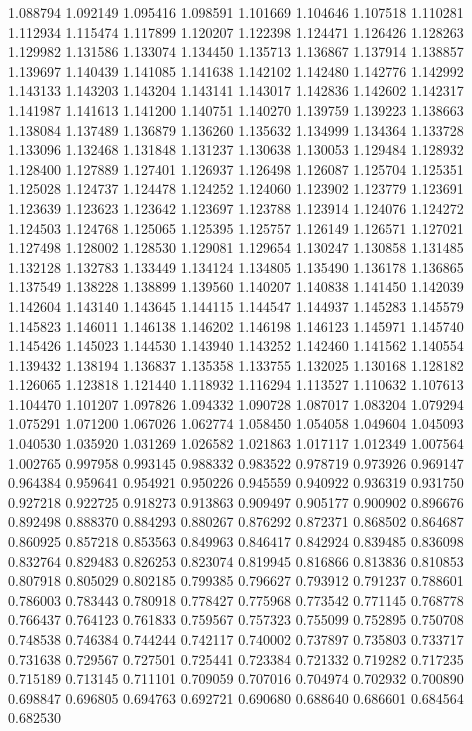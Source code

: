 1.088794
1.092149
1.095416
1.098591
1.101669
1.104646
1.107518
1.110281
1.112934
1.115474
1.117899
1.120207
1.122398
1.124471
1.126426
1.128263
1.129982
1.131586
1.133074
1.134450
1.135713
1.136867
1.137914
1.138857
1.139697
1.140439
1.141085
1.141638
1.142102
1.142480
1.142776
1.142992
1.143133
1.143203
1.143204
1.143141
1.143017
1.142836
1.142602
1.142317
1.141987
1.141613
1.141200
1.140751
1.140270
1.139759
1.139223
1.138663
1.138084
1.137489
1.136879
1.136260
1.135632
1.134999
1.134364
1.133728
1.133096
1.132468
1.131848
1.131237
1.130638
1.130053
1.129484
1.128932
1.128400
1.127889
1.127401
1.126937
1.126498
1.126087
1.125704
1.125351
1.125028
1.124737
1.124478
1.124252
1.124060
1.123902
1.123779
1.123691
1.123639
1.123623
1.123642
1.123697
1.123788
1.123914
1.124076
1.124272
1.124503
1.124768
1.125065
1.125395
1.125757
1.126149
1.126571
1.127021
1.127498
1.128002
1.128530
1.129081
1.129654
1.130247
1.130858
1.131485
1.132128
1.132783
1.133449
1.134124
1.134805
1.135490
1.136178
1.136865
1.137549
1.138228
1.138899
1.139560
1.140207
1.140838
1.141450
1.142039
1.142604
1.143140
1.143645
1.144115
1.144547
1.144937
1.145283
1.145579
1.145823
1.146011
1.146138
1.146202
1.146198
1.146123
1.145971
1.145740
1.145426
1.145023
1.144530
1.143940
1.143252
1.142460
1.141562
1.140554
1.139432
1.138194
1.136837
1.135358
1.133755
1.132025
1.130168
1.128182
1.126065
1.123818
1.121440
1.118932
1.116294
1.113527
1.110632
1.107613
1.104470
1.101207
1.097826
1.094332
1.090728
1.087017
1.083204
1.079294
1.075291
1.071200
1.067026
1.062774
1.058450
1.054058
1.049604
1.045093
1.040530
1.035920
1.031269
1.026582
1.021863
1.017117
1.012349
1.007564
1.002765
0.997958
0.993145
0.988332
0.983522
0.978719
0.973926
0.969147
0.964384
0.959641
0.954921
0.950226
0.945559
0.940922
0.936319
0.931750
0.927218
0.922725
0.918273
0.913863
0.909497
0.905177
0.900902
0.896676
0.892498
0.888370
0.884293
0.880267
0.876292
0.872371
0.868502
0.864687
0.860925
0.857218
0.853563
0.849963
0.846417
0.842924
0.839485
0.836098
0.832764
0.829483
0.826253
0.823074
0.819945
0.816866
0.813836
0.810853
0.807918
0.805029
0.802185
0.799385
0.796627
0.793912
0.791237
0.788601
0.786003
0.783443
0.780918
0.778427
0.775968
0.773542
0.771145
0.768778
0.766437
0.764123
0.761833
0.759567
0.757323
0.755099
0.752895
0.750708
0.748538
0.746384
0.744244
0.742117
0.740002
0.737897
0.735803
0.733717
0.731638
0.729567
0.727501
0.725441
0.723384
0.721332
0.719282
0.717235
0.715189
0.713145
0.711101
0.709059
0.707016
0.704974
0.702932
0.700890
0.698847
0.696805
0.694763
0.692721
0.690680
0.688640
0.686601
0.684564
0.682530
